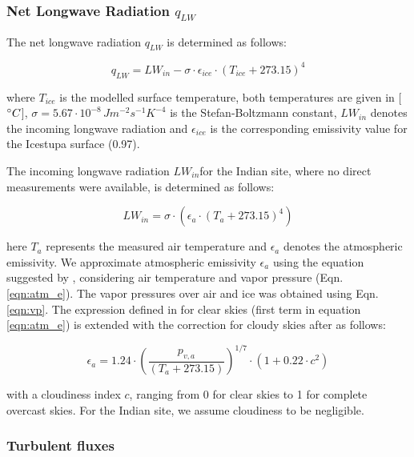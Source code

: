 \documentclass[utf8]{frontiersSCNS} %
\begin{document}
\subsubsection{Net Longwave Radiation \texorpdfstring{$q_{LW}$}{Lg}}

The net longwave radiation $q_{LW}$ is determined as follows:

\begin{equation} q_{LW}= LW_{in}-\sigma \cdot \epsilon_{ice} \cdot {(T_{ice}+ 273.15)}^4
	\label{eqn:LW} \end{equation}

where $T_{ice}$ is the modelled surface temperature, both temperatures are given in [$\degree C$],
$\sigma=5.67\cdot10^{-8}\,Jm^{-2}s^{-1}K^{-4}$ is the Stefan-Boltzmann constant, $LW_{in}$ denotes the incoming longwave
radiation and $\epsilon_{ice}$ is the corresponding emissivity value for the Icestupa surface (0.97).

The incoming longwave radiation $LW_{in}$for the Indian site, where no direct measurements were available, is determined
as follows:

\begin{equation} LW_{in}=\sigma \cdot (\epsilon_a \cdot {(T_a+ 273.15)}^4)
	\label{eqn:LWin} \end{equation}

here $T_a$ represents the measured air temperature and $\epsilon_a$ denotes the atmospheric emissivity. We approximate
atmospheric emissivity $\epsilon_a$ using the equation suggested by \cite{Brutsaert_1982}, considering air temperature
and vapor pressure (Eqn.  \ref{eqn:atm_e}). The vapor pressures over air and ice was obtained using Eqn. \ref{eqn:vp}.
The expression defined in \cite{Brutsaert_1975} for clear skies (first term in equation \ref{eqn:atm_e}) is extended
with the correction for cloudy skies after \cite{Brutsaert_1982} as follows:

\begin{equation} \epsilon_a=1.24 \cdot (\frac{p_{v,a}}{(T_a+273.15)})^{1/7}\cdot(1+0.22\cdot{c}^2) \label{eqn:atm_e}
\end{equation}

with a cloudiness index $c$, ranging from 0 for clear skies to 1 for complete overcast skies. For the Indian site, we
assume cloudiness to be negligible.

\subsubsection{Turbulent fluxes}
\end{document}
